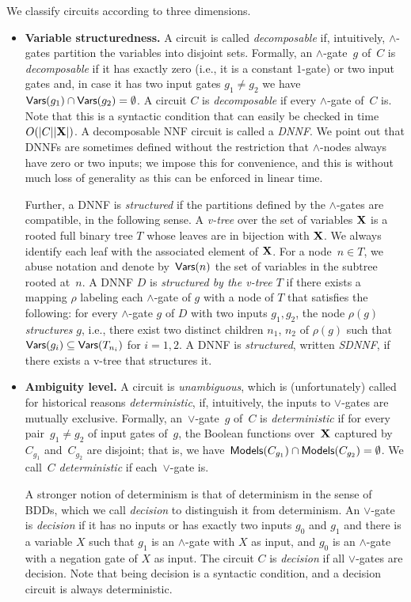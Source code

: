 We classify circuits according to three
dimensions.

\begin{itemize}
    \item \textbf{Variable structuredness.} A circuit is called \emph{decomposable} if, intuitively, $\land$-gates partition the variables into disjoint sets.
Formally, an $\land$-gate~$g$ of~$C$ is
\emph{decomposable} if it has exactly zero (i.e., it is a constant $1$-gate) or two input gates and, in case it has two input gates $g_1\neq g_2$ we
have~$\mathsf{Vars}(g_1) \cap \mathsf{Vars}(g_2) = \emptyset$. A circuit $C$ is \emph{decomposable} if every $\land$-gate of~$C$ is.
    Note that this is a syntactic condition that can easily be checked in time $O(|C||\mathbf{X}|)$. A decomposable NNF circuit is called a \emph{DNNF}. We point out that DNNFs are sometimes defined without the restriction that $\land$-nodes always have zero or two inputs; we impose this for convenience, and this is without much loss of generality as this can be enforced in linear time.
    
    Further, a DNNF is \emph{structured} if the partitions defined by the $\land$-gates are compatible, in the following sense.
A \emph{v-tree} over the set of variables $\mathbf{X}$ is a rooted full binary tree $T$ whose leaves are in bijection with $\mathbf{X}$.  We
always identify each leaf with the associated element of $\mathbf{X}$. For a node~$n\in T$, we abuse notation and denote by~$\mathsf{Vars}(n)$ the set of variables in the subtree rooted at~$n$. A DNNF $D$ is \emph{structured by the v-tree $T$} if there exists a mapping $\rho$ labeling each $\land$-gate of $g$ with a node of $T$ that satisfies the following: for
every $\land$-gate $g$ of $D$ with two inputs $g_1, g_2$, the node $\rho(g)$ \emph{structures} $g$, i.e.,
there exist two distinct children $n_1$, $n_2$ of $\rho(g)$ such that $\mathsf{Vars}(g_i) \subseteq \mathsf{Vars}(T_{n_i} )$ for $i=1,2$. A DNNF is \emph{structured}, written \emph{SDNNF}, if there exists a v-tree that structures it. 


\item \textbf{Ambiguity level.} A circuit is \emph{unambiguous}, which is (unfortunately) called for historical reasons \emph{deterministic}, if, intuitively, the inputs to $\lor$-gates are mutually exclusive. Formally,
an~$\lor$-gate~$g$ of~$C$ is \emph{deterministic} if
for every pair~$g_1\neq g_2$ of input gates of~$g$, the Boolean functions
over~$\mathbf{X}$ captured by~$C_{g_1}$ and~$C_{g_2}$ are disjoint; that is, we
have~$\mathsf{Models}(C_{g_1}) \cap \mathsf{Models}(C_{g_2}) = \emptyset$.  We call~$C$
\emph{deterministic} if each~$\lor$-gate is.
    
A stronger notion of determinism is that of determinism in the sense of BDDs, which we call \emph{decision} to distinguish it from determinism. An $\lor$-gate is \emph{decision} if it has no inputs or has exactly two inputs $g_0$ and $g_1$ and there is a variable $X$ such that $g_1$ is an $\land$-gate with $X$ as input, and $g_0$ is an $\land$-gate with a negation gate of $X$ as input. The circuit $C$ is \emph{decision} if all $\lor$-gates are decision. Note that being decision is a syntactic condition, and a decision circuit is always deterministic.
\end{itemize}

